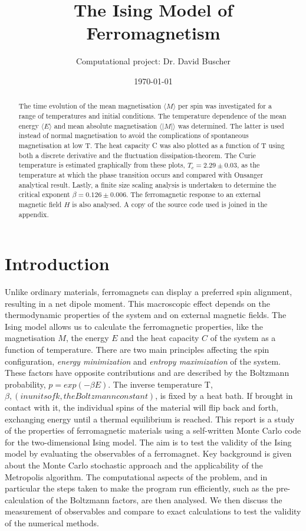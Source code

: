\documentclass[a4paper]{article}
\title{The Ising Model of Ferromagnetism }
\author{Computational project: Dr. David Buscher}
\date{\today}
\begin{document}
\maketitle

\begin{abstract}

The time evolution of the mean magnetisation $ \langle M \rangle $ per spin was investigated for a range of temperatures and initial conditions. The temperature dependence of the mean energy $ \langle E \rangle $ and mean absolute magnetisation $ \langle |M| \rangle $ was determined. The latter is used instead of normal magnetisation to avoid the complications of spontaneous magnetisation at low T. The heat capacity C was also plotted as a function of T using both a discrete derivative and the fluctuation dissipation-theorem. The Curie temperature is estimated graphically from these plots, $T_c = 2.29 \pm 0.03$, as the temperature at which the phase transition occurs and compared with Onsanger analytical result. Lastly, a finite size scaling analysis is undertaken to determine the critical exponent $\beta = 0.126 \pm 0.006$. The ferromagnetic response to an external magnetic field $H$ is also analysed. A copy of the source code used is joined in the appendix.


\end{abstract}


\section{Introduction}

Unlike ordinary materials, ferromagnets can display a preferred spin alignment, resulting in a net dipole moment. This macroscopic effect depends on the thermodynamic properties of the system and on external magnetic fields. The Ising model allows us to calculate the ferromagnetic properties, like the magnetisation $M$, the energy $ E $ and the heat capacity $C$ of the system as a function of temperature. There are two main principles affecting the spin configuration, \textit{energy minimization} and \textit{entropy maximization} of the system. These factors have opposite contributions and are described by the Boltzmann probability, $ p = exp(-\beta E) $. The inverse temperature T, $\beta, (in units of k, the Boltzmann constant)$, is fixed by a heat bath. If brought in contact with it, the individual spins of the material will flip back and forth, exchanging energy until a thermal equilibrium is reached. This report is a study of the properties of ferromagnetic materials using a self-written Monte Carlo code for the two-dimensional Ising model. The aim is to test the validity of the Ising model by evaluating the observables of a ferromagnet. Key background is given about the Monte Carlo stochastic approach and the applicability of the Metropolis algorithm. The computational aspects of the problem, and in particular the steps taken to make the program run efficiently, such as the pre-calculation of the Boltzmann factors, are then analysed. We then discuss the measurement of observables and compare to exact calculations to test the validity of the numerical methods.
\end{document}
